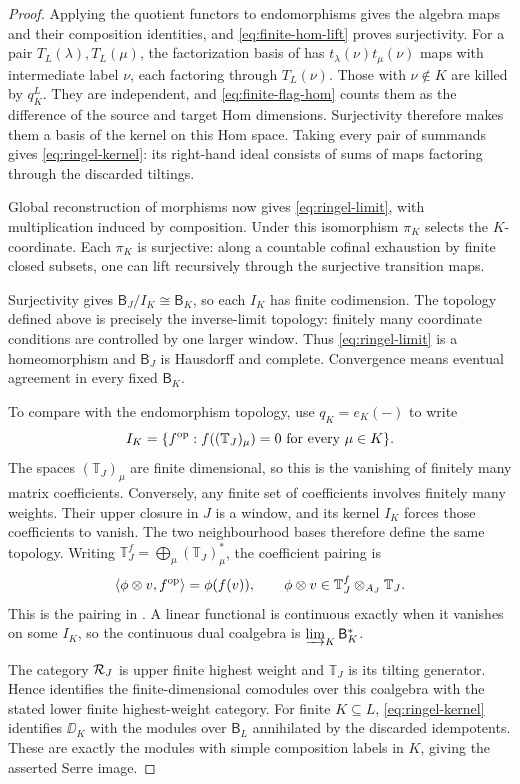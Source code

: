 \documentclass[11pt,reqno]{amsart}
\newcommand{\BJ}{\mathsf B_J}\newcommand{\BK}{\mathsf B_K}\newcommand{\TJ}{\mathbb T_J}\newcommand{\GK}{\mathsf G_K}\newcommand{\GJ}{\mathsf G_J}
\theoremstyle{definition}
\theoremstyle{remark}
\numberwithin{equation}{section}
\begin{document}
\begin{proof}
Applying the quotient functors to endomorphisms gives the algebra maps
and their composition identities, and \eqref{eq:finite-hom-lift} proves
surjectivity. For a pair $T_L(\lambda),T_L(\mu)$, the factorization
basis of \cite[Corollary~4.44]{BS} has
$t_\lambda(\nu)t_\mu(\nu)$ maps with intermediate label $\nu$,
each factoring through $T_L(\nu)$. Those with $\nu\notin K$
are killed by $q_K^L$. They are independent, and
\eqref{eq:finite-flag-hom} counts them as the difference of the
source and target Hom dimensions. Surjectivity therefore makes
them a basis of the kernel on this Hom space. Taking every pair
of summands gives \eqref{eq:ringel-kernel}: its right-hand ideal
consists of sums of maps factoring through the discarded tiltings.

Global reconstruction of morphisms now gives
\eqref{eq:ringel-limit}, with multiplication induced by composition.
Under this isomorphism $\pi_K$ selects the $K$-coordinate.
Each $\pi_K$ is surjective: along a countable cofinal exhaustion
by finite closed subsets, one can lift recursively through the surjective
transition maps.

Surjectivity gives $\BJ/I_K\cong\BK$, so each $I_K$ has finite
codimension. The topology defined above is precisely the inverse-limit
topology: finitely many coordinate conditions are controlled by one
larger window. Thus \eqref{eq:ringel-limit} is a homeomorphism and
$\BJ$ is Hausdorff and complete. Convergence means eventual agreement
in every fixed $\BK$.

To compare with the endomorphism topology, use $q_K=e_K(-)$ to write
\[
 I_K=\{f^{\op}:f((\TJ)_\mu)=0\text{ for every }\mu\in K\}.
\]
The spaces $(\TJ)_\mu$ are finite dimensional, so this is the vanishing
of finitely many matrix coefficients. Conversely, any finite set of
coefficients involves finitely many weights. Their upper closure in
$J$ is a window, and its kernel $I_K$ forces those coefficients to
vanish. The two neighbourhood bases therefore define the same topology.
Writing $\TJ^f=\bigoplus_\mu(\TJ)_\mu^*$, the coefficient pairing is
\[
 \langle\phi\otimes v,f^{\op}\rangle=\phi(f(v)),
 \qquad \phi\otimes v\in\TJ^f\otimes_{A_J}\TJ.
\]
This is the pairing in \cite[Lemma~2.10, (2.12)--(2.15)]{BS}.
A linear functional is continuous exactly when it vanishes on some
$I_K$, so the continuous dual coalgebra is $\varinjlim_K\BK^*$.

The category $\mathcal R_J$ is upper finite highest weight and $\TJ$
is its tilting generator. Hence \cite[Theorem~4.27]{BS} identifies
the finite-dimensional comodules over this coalgebra with the stated
lower finite highest-weight category. For finite $K\subseteq L$,
\eqref{eq:ringel-kernel} identifies $\DD_K$ with the modules over
$\mathsf B_L$ annihilated by the discarded idempotents. These are
exactly the modules with simple composition labels in $K$, giving
the asserted Serre image.


\end{proof}
\end{document}
